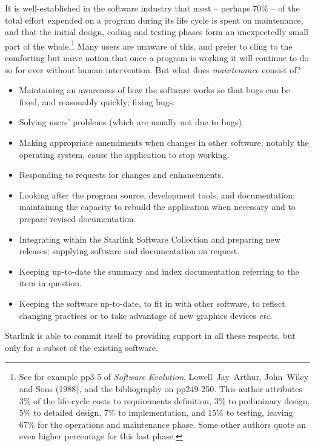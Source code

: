 It is well-established in the software industry that
most -- perhaps 70\% -- of the total effort expended on
a program during its life cycle is spent on maintenance,
and that the initial design, coding and testing phases
form an unexpectedly small part of the
whole.\footnote{See for example pp3-5 of {\it Software Evolution}, Lowell~Jay~Arthur,
John~Wiley and Sons (1988), and the bibliography on pp249-250.
This author attributes 3\% of the life-cycle costs to requirements
definition, 3\% to preliminary design, 5\% to detailed design,
7\% to implementation, and 15\% to testing, leaving 67\% for the operations
and maintenance phase.  Some other authors quote an even higher
percentage for this last phase.}
Many users are
unaware of this, and prefer to cling to the comforting but na\"{\i}ve
notion that
once a program is working it will continue to do so for
ever without human intervention.  But what does
{\it maintenance} consist of?
\begin{itemize}
\item Maintaining an awareness of how the software works so that bugs can
be fixed, and reasonably quickly;  fixing bugs.
\item Solving users' problems (which are usually not due to bugs).
\item Making appropriate amendments when changes in other
software, notably the operating system, cause the application
to stop working.
\item Responding to requests for changes and enhancements.
\item Looking after the program source, development tools,
and documentation;  maintaining the capacity to
rebuild the application when necessary and to prepare
revised documentation.
\item Integrating within the Starlink Software Collection and
preparing new releases;  supplying software and documentation on request.
\item Keeping up-to-date the summary and index documentation referring
to the item in question.
\item Keeping the software up-to-date,
to fit in with other software, to reflect changing practices or
to take advantage of new graphics devices {\it etc}.
\end{itemize}
Starlink is able to commit itself to providing support in
all these respects, but only for a subset of the existing software.

